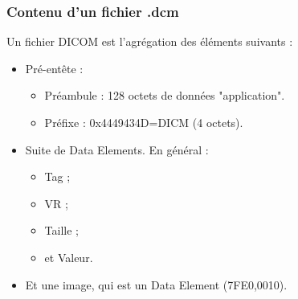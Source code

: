 \frame
{
	\frametitle{Contenu d'un fichier .dcm}
	
	Un fichier DICOM est l'agr\'egation des \'el\'ements suivants :
	\begin{itemize}
		\item<2-> Pr\'e-ent\^ete :
		\begin{itemize}
			\item<3-> Pr\'eambule : 128 octets de donn\'ees "application".
			\item<4-> Pr\'efixe : 0x4449434D=DICM (4 octets).
		\end{itemize}
		\item<5-> Suite de Data Elements.
		En g\'en\'eral :
		\begin{itemize}
			\item<6-> Tag ;
			\item<7-> VR ;
			\item<8-> Taille ;
			\item<9-> et Valeur.
		\end{itemize}
		\item<10-> Et une image, qui est un Data Element (7FE0,0010).
	\end{itemize}
}


